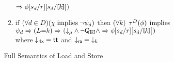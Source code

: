 \begin{figure*}
\begin{center}
\begin{minipage}{0.88\textwidth}
\begin{enumerate}
\begin{math}
{         \limplies \aForm[\bReg_\bEv/\aReg][\bReg_\bEv/\REF{\dVal}]
        )
      }      
    \end{math}
  \item if 
    \begin{math}
      (\forall\bEv\in\bEvs)(\cForm \textimplies
      \lnot\bForm_\bEv)
    \end{math}
    then
    \begin{math}
      (\forall\dVal)
    \end{math}
    $\aTr[\bEvs](\aForm)$ implies 
    \begin{math}
      \bForm_\bEv
      \limplies (\cExp{=}\dVal)
      \limplies \PBR{        
        \Dmode{\amode}
        \land \lnot\QxREF{\dVal}
        \land
        \limplies \aForm[\bReg_\bEv/\aReg][\bReg_\bEv/\REF{\dVal}]
      }      
    \end{math}
    \\ where $\Dmode{\mRLX}=\TRUE$ and $\Dmode{\mRA}=\Dx{\dVal}$
  \end{enumerate}  
  \end{minipage}
  \end{center}
  \caption{Full Semantics of Load and Store}
  \label{fig:full}
\end{figure*}